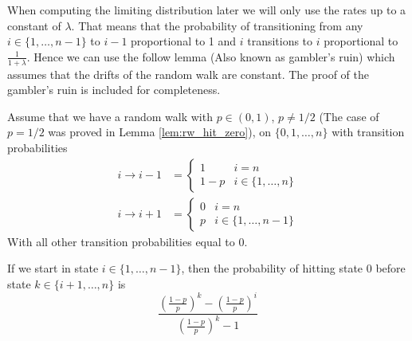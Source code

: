 \begin{remark}
When computing the limiting distribution later we will only use the rates up to a constant of $\lambda$.
That means that the probability of transitioning from any $i \in \{1,\ldots,n - 1\}$ to $i - 1$ proportional to 1 and $i$ transitions to $i$ proportional to $\frac{1}{1 + \lambda}$.
Hence we can use the follow lemma (Also known as gambler's ruin) which assumes that the drifts of the random walk are constant.
The proof of the gambler's ruin is included for completeness.
\end{remark}

\begin{lemma}\label{lem:rw_p_hit_zero}
Assume that we have a random walk with $p \in (0, 1)$, $p \not = 1/2$ (The case of $p = 1/2$ was proved in Lemma \ref{lem:rw_hit_zero}), on $\{0,1,\ldots, n\}$ with transition probabilities
\begin{align*}
    i \to i - 1 &= \begin{cases}
        1 & i = n\\
        1 - p & i \in \{1,\ldots, n\}
    \end{cases}\\
    i \to i + 1 &= \begin{cases}
        0 & i = n\\
        p & i \in \{1,\ldots, n-1\}
    \end{cases}
\end{align*}
With all other transition probabilities equal to 0.

If we start in state $i \in \{1,\ldots, n - 1\}$, then the probability of hitting state 0 before state $k \in \{i + 1, \ldots, n\}$ is
$$
\frac{
        \left( \frac{1 - p}{p} \right)^{k} - \left( \frac{1 - p}{p} \right)^{i}
    }{
         \left( \frac{1 - p}{p} \right)^{k} - 1
    }
$$
\end{lemma}

